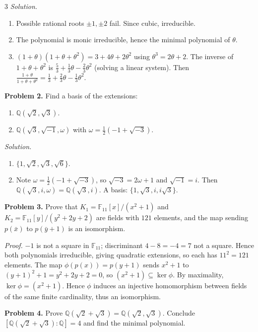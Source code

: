 \documentclass[10pt,landscape]{article}
\begin{document}
\begin{multicols}{3}
\textit{Solution.}
\begin{enumerate}
\item Possible rational roots \(\pm1,\pm2\) fail. Since cubic, irreducible.
\item The polynomial is monic irreducible, hence the minimal polynomial of \(\theta\).
\item \((1+\theta)(1+\theta+\theta^2)=3+4\theta+2\theta^2\) using \(\theta^3=2\theta+2\). The inverse of \(1+\theta+\theta^2\) is \(\frac53+\frac13\theta-\frac23\theta^2\) (solving a linear system). Then \(\frac{1+\theta}{1+\theta+\theta^2}=\frac13+\frac23\theta-\frac13\theta^2\). 
\end{enumerate}

\noindent\textbf{Problem 2.} Find a basis of the extensions:
\begin{enumerate}
\item \(\mathbb{Q}(\sqrt2,\sqrt3)\).
\item \(\mathbb{Q}(\sqrt3,\sqrt{-1},\omega)\) with \(\omega=\frac12(-1+\sqrt{-3})\).
\end{enumerate}

\textit{Solution.}
\begin{enumerate}
\item \(\{1,\sqrt2,\sqrt3,\sqrt6\}\).
\item Note \(\omega=\frac12(-1+\sqrt{-3})\), so \(\sqrt{-3}=2\omega+1\) and \(\sqrt{-1}=i\). Then \(\mathbb{Q}(\sqrt3,i,\omega)=\mathbb{Q}(\sqrt3,i)\). A basis: \(\{1,\sqrt3,i,i\sqrt3\}\). 
\end{enumerate}

\noindent\textbf{Problem 3.} Prove that \(K_1=\mathbb{F}_{11}[x]/(x^2+1)\) and \(K_2=\mathbb{F}_{11}[y]/(y^2+2y+2)\) are fields with \(121\) elements, and the map sending \(p(\bar x)\) to \(p(\bar y+1)\) is an isomorphism.

\textit{Proof.} \(-1\) is not a square in \(\mathbb{F}_{11}\); discriminant \(4-8=-4=7\) not a square. Hence both polynomials irreducible, giving quadratic extensions, so each has \(11^2=121\) elements. The map \(\phi(p(x))=p(y+1)\) sends \(x^2+1\) to \((y+1)^2+1=y^2+2y+2=0\), so \((x^2+1)\subseteq\ker\phi\). By maximality, \(\ker\phi=(x^2+1)\). Hence \(\phi\) induces an injective homomorphism between fields of the same finite cardinality, thus an isomorphism. 

\noindent\textbf{Problem 4.} Prove \(\mathbb{Q}(\sqrt2+\sqrt3)=\mathbb{Q}(\sqrt2,\sqrt3)\). Conclude \([\mathbb{Q}(\sqrt2+\sqrt3):\mathbb{Q}]=4\) and find the minimal polynomial.


\end{multicols}
\end{document}
